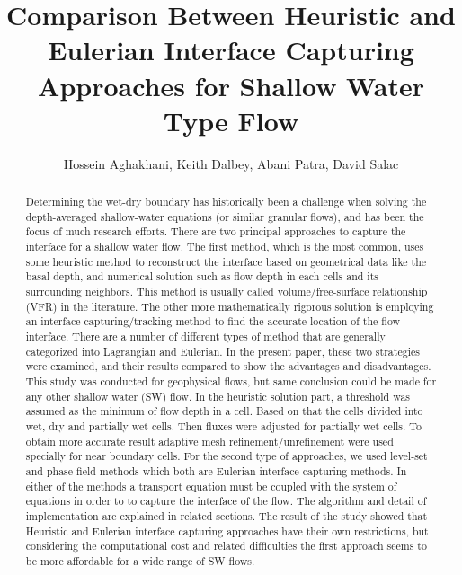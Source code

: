 \documentclass[letterpaper,10pt]{article}
\title{Comparison Between Heuristic and Eulerian Interface Capturing Approaches for Shallow Water Type Flow}
\author{Hossein Aghakhani, Keith Dalbey, Abani Patra, David Salac}
\date{}
\begin{document}

\maketitle

\begin {abstract}{
Determining the wet-dry boundary has historically been a challenge when 
solving the depth-averaged shallow-water equations (or similar granular flows), and has 
been the focus of much research efforts.
There are two principal approaches to capture the interface for a shallow water flow. The first method, 
which is the most common, uses some heuristic method to reconstruct the interface 
based on geometrical data like the basal depth, and numerical solution such as flow depth in each 
cells and its surrounding neighbors. This method is usually called volume/free-surface relationship (VFR)
in the literature.
The other more mathematically rigorous solution is employing an interface capturing/tracking 
method to find the accurate location of the flow interface. There are a number of different types 
of method that are generally categorized into Lagrangian and Eulerian.
In the present paper, these two strategies were examined, and their results compared to show the advantages and disadvantages. 
This study was conducted for geophysical flows, but same conclusion could be made for 
any other shallow water (SW) flow.\newline
In the heuristic solution part, a threshold was assumed as the minimum of flow depth in a cell.
Based on that the cells divided into wet, dry and partially wet cells. Then fluxes were adjusted for partially
wet cells. To obtain more accurate result adaptive mesh refinement/unrefinement were used specially for near boundary 
cells.
For the second type of approaches, we used level-set and phase field methods which both are Eulerian interface capturing 
methods. In either of the methods a transport equation must be coupled with the system of equations in order to 
to capture the interface of the flow. The algorithm and detail of implementation are explained in related sections.
The result of the study showed that Heuristic and Eulerian interface capturing approaches have their own restrictions, 
but considering the computational cost and related difficulties the first approach seems to be more affordable for a 
wide range of SW flows.
}
\end{abstract}
\end{document}
